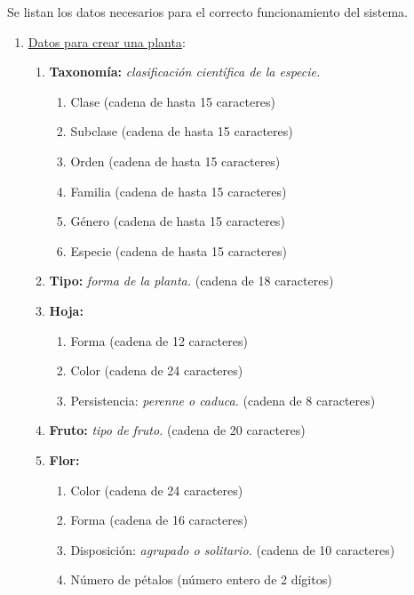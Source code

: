 \documentclass[10pt,a4paper]{article}
\begin{document}
Se listan los datos necesarios para el correcto funcionamiento del sistema.
\newline
\begin{enumerate}[label={RD\arabic*.} ,leftmargin=2.8\parindent]
 
 	\item \underline{Datos para crear una planta}:
	\begin{enumerate}[label={RD1.\arabic*.}]
	
	\item 
		\textbf{Taxonomía:} \textit{clasificación científica de la especie.}
	\begin{enumerate}[label=-]
		\item Clase (cadena de hasta 15 caracteres)
		\item Subclase (cadena de hasta 15 caracteres)
		\item Orden (cadena de hasta 15 caracteres)
		\item Familia (cadena de hasta 15 caracteres)
		\item Género (cadena de hasta 15 caracteres)
		\item Especie (cadena de hasta 15 caracteres)
	\end{enumerate}
	\medskip
	
	\item 
		\textbf{Tipo:} \textit{forma de la planta.} (cadena de 18 caracteres)

	\medskip
	\item
		\textbf{Hoja:}
	\begin{enumerate}[label=-]
		\item Forma (cadena de 12 caracteres)
		\item Color (cadena de 24 caracteres)
		\item Persistencia: \textit{perenne o caduca.} (cadena de 8 caracteres)
	\end{enumerate}

	\medskip	
	\item
		\textbf{Fruto:} \textit{tipo de fruto.} (cadena de 20 caracteres)

	\medskip
	\item
		\textbf{Flor:}
	\begin{enumerate} [label=-]
		\item Color (cadena de 24 caracteres)
		\item Forma (cadena de 16 caracteres)
		\item Disposición: \textit{agrupado o solitario.} (cadena de 10 caracteres)
		\item Número de pétalos (número entero de 2 dígitos)
	\end{enumerate}
	

\end{enumerate}
\end{enumerate}
\end{document}
